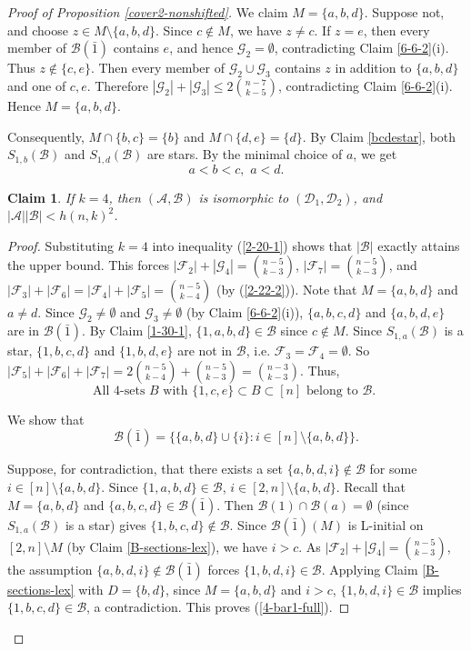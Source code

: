 \documentclass[a4paper,11pt]{article}
\newtheorem{claim}[theorem]{Claim}
\newcommand{\m}{\mathcal}
\begin{document}
\begin{proof}[Proof of Proposition \ref{cover2-nonshifted}]
We claim $M=\{a,b,d\}$. Suppose not, and choose 
$z\in M\setminus\{a,b,d\}.$
Since $c\notin M$, we have $z\ne c$. If $z=e$, then every member of
$\mathcal B(\bar1)$ contains $e$, and hence $\mathcal G_2=\emptyset$,
contradicting Claim \ref{6-6-2}(i).
Thus $z\notin\{c,e\}$. Then every member of $\mathcal G_2\cup\mathcal G_3$
contains $z$ in addition to $\{a,b,d\}$ and one of $c,e$. Therefore $|\mathcal G_2|+|\mathcal G_3|\le 2{n-7\choose k-5}$,
contradicting Claim \ref{6-6-2}(i). Hence $M=\{a,b,d\}$.

Consequently, $M\cap\{b,c\}=\{b\}$ and $M\cap\{d,e\}=\{d\}$. By Claim \ref{bcdestar}, both $S_{1,b}(\m B)$ and  $S_{1,d}(\m B)$ are stars.
By the minimal choice of $a$, we get 
\[
a<b<c, \,\, a<d.
\]
 

\begin{claim}\label{2-27-3}
 If $k= 4$, then $(\m A, \m B)$ is isomorphic to $(\m D_1, \m D_2)$, and $|\m A||\m B|<h(n,k)^2$. 
\end{claim}

\begin{proof}
Substituting $k=4$ into inequality (\ref{2-20-1}) shows that
$|\mathcal{B}|$ exactly attains the upper bound.
This forces $|\m F_2|+|\m G_4|={n-5\choose k-3}$, $|\m F_7|={n-5\choose k-3}$, and $|\m F_3|+|\m F_6|=|\m F_4|+|\m F_5|= {n-5\choose k-4}$ (by (\ref{2-22-2})). 
Note that $M=\{a,b,d\}$ and $a\ne d$. 
Since $\m G_2\ne \emptyset$ and $\m G_3\ne \emptyset$ (by Claim \ref{6-6-2}(i)), $\{a,b,c,d\}$ and $\{a,b,d,e\}$ are in $\m B(\bar{1})$. 
By Claim \ref{1-30-1}, $\{1,a,b,d\}\in \m B$ since $c\not\in M$. 
Since $S_{1,a}(\m B)$ is a star, $\{1,b,c,d\}$ and $\{1,b,d,e\}$ are not in $\m B$, i.e. $\m F_3=\m F_4=\emptyset$. 
So $|\m F_5|+|\m F_6|+|\m F_7|=2{n-5\choose k-4}+{n-5\choose k-3}={n-3\choose k-3}$. Thus, 
\begin{equation}\label{1ce}
\text{All $4$-sets $B$ with $\{1,c,e\}\subset B\subset [n]$ belong to $\m B$. }
\end{equation}

We show that 
\begin{equation}\label{4-bar1-full}
\m B(\bar{1})=\{\{a,b,d\}\cup \{i\}: i\in [n]\setminus \{a,b,d\}\}.
\end{equation}

Suppose, for contradiction, that there exists a set $\{a,b,d,i\}\not\in \m B$ for some $i\in [n]\setminus \{a,b,d\}$. 
Since $\{1,a,b,d\}\in \m B$, $i\in [2,n]\setminus \{a,b,d\}$.
Recall that $M=\{a,b,d\}$ and $\{a,b,c,d\}\in\m B(\bar{1})$. 
Then $\m B(1)\cap \m B(a)=\emptyset$ (since $S_{1,a}(\m B)$ is a star) gives $\{1,b,c,d\}\not\in \m B$.
Since $\m B(\bar1)(M)$ is L-initial on $[2,n]\setminus M$ (by Claim \ref{B-sections-lex}), we have $i>c$. 
As $|\m F_2|+|\m G_4|={n-5\choose k-3}$, the assumption $\{a,b,d,i\}\not\in \m B(\bar{1})$ forces $\{1,b,d,i\}\in \m B$. 
Applying Claim \ref{B-sections-lex} with $D=\{b,d\}$, since $M=\{a,b,d\}$ and $i>c$, $\{1,b,d,i\}\in \m B$ implies $\{1,b,c,d\}\in \m B$, a contradiction. This proves (\ref{4-bar1-full}).


\end{proof}
\end{proof}
\end{document}
